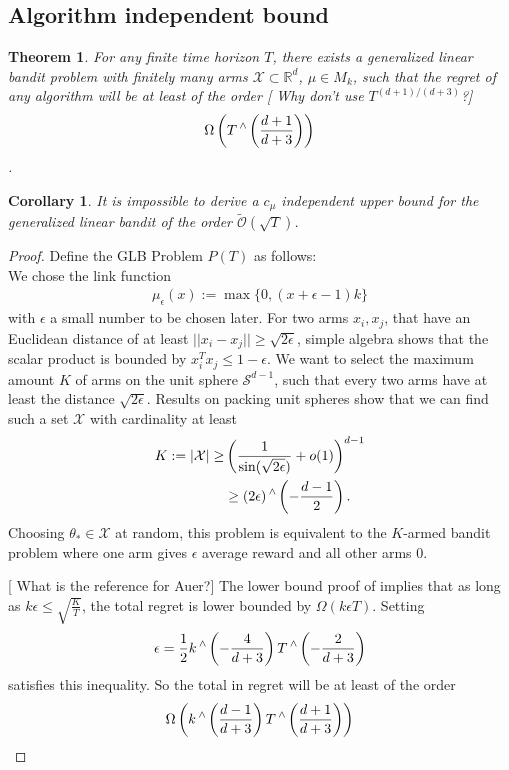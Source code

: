 \documentclass[twoside]{article} \usepackage{aistats2017}
\DeclareMathOperator\caret{\raisebox{1ex}{$\scriptstyle\wedge$}}
\newtheorem{theorem}{Theorem}
\newtheorem{corollary}{Corollary}[theorem]
\newcommand{\shuai}[1]{{\color{blue!50!black} [\text{Shuai:} #1]}}
\begin{document}
\subsection{Algorithm independent bound}
\begin{theorem}
For any finite time horizon $T$, there exists a generalized linear bandit problem with finitely many arms $\mathcal{X}\subset\mathbb{R}^d$, $\mu\in M_k$, such that the regret of any algorithm will be at least of the order
\shuai{Why don't use $T^{(d+1)/(d+3)}$?}
$$\Omega\left(T\caret\left(\frac{d+1}{d+3}\right)\right)$$.
\end{theorem}
\begin{corollary}
It is impossible to derive a $c_\mu$ independent upper bound for the generalized linear bandit of the order $\tilde{\mathcal{O}}(\sqrt{T})$.
\end{corollary}
\begin{proof}
    Define the GLB Problem $P(T)$ as follows:\\
    We chose the link function 
    \begin{align}
        \mu_\epsilon(x) := \max\{0, (x+\epsilon-1)k\}
    \end{align}
    with $\epsilon$ a small number to be chosen later. For two arms $x_i,x_j$, that have an Euclidean distance of at least $||x_i-x_j||\geq\sqrt{2\epsilon}$, simple algebra shows that the scalar product is bounded by $x_i^Tx_j \leq 1-\epsilon$. We want to select the maximum amount $K$ of arms on the unit sphere $\mathcal{S}^{d-1}$, such that every two arms have at least the distance $\sqrt{2\epsilon}$. Results on packing
     unit spheres \cite{shannon59} \cite{wyner65} show that we can find such a set $\mathcal{X}$ with cardinality at least
     \begin{align*}
     K:=|\mathcal{X}| \geq& \left(\frac{1}{\sin(\sqrt{2\epsilon})}+o(1)\right)^{d-1}\\
     &\geq (2\epsilon)\caret\left(-\frac{d-1}{2}\right).
     \end{align*}
     Choosing $\theta_*\in \mathcal{X}$ at random, this problem is equivalent to the $K$-armed bandit problem where one arm gives $\epsilon$ average reward and all other arms $0$.
     
     \shuai{What is the reference for Auer?}
     The lower bound proof of \cite{Auer} implies that as long as $k\epsilon\leq \sqrt{\frac{K}{T}}$, the total regret is lower bounded by $\Omega(k\epsilon T)$. Setting
     $$\epsilon = \frac{1}{2}k\caret\left(-\frac{4}{d+3}\right)T\caret\left(-\frac{2}{d+3}\right)$$
     satisfies this inequality. So the total in regret will be at least of the order
     $$\Omega \left(k\caret\left(\frac{d-1}{d+3}\right)T\caret\left(\frac{d+1}{d+3}\right)\right)$$
    
\end{proof}
\end{document}
